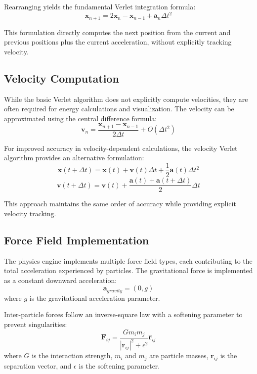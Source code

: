 \documentclass[12pt,journal,onecolumn]{IEEEtran}
\begin{document}
Rearranging yields the fundamental Verlet integration formula:
\begin{equation}
\mathbf{x}_{n+1} = 2\mathbf{x}_n - \mathbf{x}_{n-1} + \mathbf{a}_n \Delta t^2
\end{equation}

This formulation directly computes the next position from the current and previous positions plus the current acceleration, without explicitly tracking velocity.

\subsection{Velocity Computation}
While the basic Verlet algorithm does not explicitly compute velocities, they are often required for energy calculations and visualization. The velocity can be approximated using the central difference formula:
\begin{equation}
\mathbf{v}_n = \frac{\mathbf{x}_{n+1} - \mathbf{x}_{n-1}}{2\Delta t} + O(\Delta t^2)
\end{equation}

For improved accuracy in velocity-dependent calculations, the velocity Verlet algorithm provides an alternative formulation:
\begin{equation}
\mathbf{x}(t + \Delta t) = \mathbf{x}(t) + \mathbf{v}(t)\Delta t + \frac{1}{2}\mathbf{a}(t)\Delta t^2
\end{equation}
\begin{equation}
\mathbf{v}(t + \Delta t) = \mathbf{v}(t) + \frac{\mathbf{a}(t) + \mathbf{a}(t + \Delta t)}{2}\Delta t
\end{equation}

This approach maintains the same order of accuracy while providing explicit velocity tracking.

\subsection{Force Field Implementation}
The physics engine implements multiple force field types, each contributing to the total acceleration experienced by particles. The gravitational force is implemented as a constant downward acceleration:
\begin{equation}
\mathbf{a}_{gravity} = (0, g)
\end{equation}
where $g$ is the gravitational acceleration parameter.

Inter-particle forces follow an inverse-square law with a softening parameter to prevent singularities:
\begin{equation}
\mathbf{F}_{ij} = \frac{G m_i m_j}{|\mathbf{r}_{ij}|^2 + \epsilon^2} \hat{\mathbf{r}}_{ij}
\end{equation}
where $G$ is the interaction strength, $m_i$ and $m_j$ are particle masses, $\mathbf{r}_{ij}$ is the separation vector, and $\epsilon$ is the softening parameter.
\end{document}

